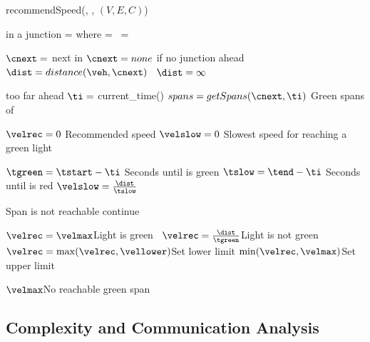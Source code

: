 \begin{algorithm}
\caption{recommendSpeed(\veh, \route, $(V, E, C)$)}\label{alg.recommendedSpeed}
\begin{algorithmic}[1]
 \Comment \veh in a junction\label{alg:recSpeed:injunction}
\State\velmax= \espeed where \eend=\vehposstart
\Else\ \velmax = \vehposspeed
\EndIf\label{alg:recSpeed:injunctionEnd}

\State $\cnext= $ next \con in \route\Comment $\cnext=none$ if no junction ahead \label{alg:recSpeed:cnext}
\ $\dist=distance(\veh,\cnext)$ \label{alg:recSpeed:distance}
\Else\ $\dist = \infty$
\EndIf

 \Return \velmax\Comment \cnext too far ahead
\EndIf
\State $\ti=$ current\_time()
\State $spans = getSpans(\cnext, \ti)$ \Comment Green spans of \cnext \label{alg:recSpeed:getSpan}

\State $\velrec = 0$ \Comment Recommended speed \label{alg:recSpeed:velrec}
\State $\velslow = 0$ \Comment Slowest speed for reaching a green light \label{alg:recSpeed:velslow}

\label{alg:recSpeed:loopSpans}
\State $\tgreen = \tstart - \ti$ \Comment Seconds until \cnextphase is green \label{alg:recSpeed:tg}
\State $\tslow = \tend - \ti$ \Comment Seconds until \cnextphase is red\label{alg:recSpeed:tr}
\State $\velslow = \frac{\dist}{\tslow}$\label{alg:recSpeed:hr}

\State\Comment Span is not reachable
\If{$\velslow > \velmax$} continue\label{alg:recSpeed:continue}
\EndIf

 $\velrec=\velmax$\Comment Light is green\label{alg:recSpeed:green}
\Else\ $\velrec = \frac{\dist}{\tgreen}$\Comment Light is not green\label{alg:recSpeed:h}
\EndIf
\State $\velrec = \max(\velrec, \vellower)$\Comment Set lower limit\label{alg:recSpeed:lowerLimit}
\State\Return $\min(\velrec, \velmax)$\Comment Set upper limit\label{alg:recSpeed:returnh}
\EndFor\label{alg:recSpeed:loopSpansEnd}

\State\Return $\velmax$\Comment No reachable green span\label{alg:recSpeed:returnmax}
\end{algorithmic}
\end{algorithm}

\subsection{Complexity and Communication Analysis}
